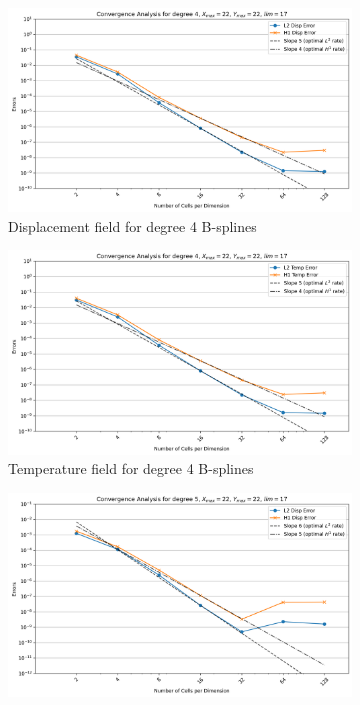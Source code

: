 \documentclass[a4paper,12pt,twoside]{report}
\begin{document}
\begin{figure}[!h]\ContinuedFloat
	\begin{subfigure}[b]{0.49\textwidth}
		\includegraphics[width=\textwidth]{figures/figures_thermoelas_degree/Disp_X_max=22_Y_max=22_lim=17_d=4_disp.png}
		\caption{Displacement field for degree 4 B-splines}
		\label{fig:disp_d4_lim_17}
	\end{subfigure}
	\begin{subfigure}[b]{0.49\textwidth}
		\includegraphics[width=\textwidth]{figures/figures_thermoelas_degree/Temp_X_max=22_Y_max=22_lim=17_d=4.png}
		\caption{Temperature field for degree 4 B-splines}
		\label{fig:temp_d4_lim_17}
	\end{subfigure}
	\begin{subfigure}[b]{0.49\textwidth}
		\includegraphics[width=\textwidth]{figures/figures_thermoelas_degree/Disp_X_max=22_Y_max=22_lim=17_d=5_disp.png}

\end{subfigure}
\end{figure}
\end{document}
